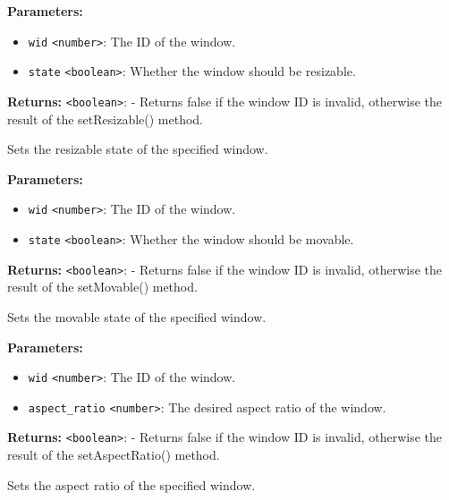 \documentclass[12pt,a4paper]{article}
\begin{document}
\noindent \textbf{Parameters:}
\begin{itemize}
  \item \texttt{wid} \texttt{<number>}: The ID of the window.
  \item \texttt{state} \texttt{<boolean>}: Whether the window should be resizable.
\end{itemize}

\noindent \textbf{Returns:} \texttt{<boolean>}: - Returns false if the window ID is invalid, otherwise the result of the setResizable() method.

\noindent Sets the resizable state of the specified window.

\vspace{5mm}
\noindent {}


\noindent \textbf{Parameters:}
\begin{itemize}
  \item \texttt{wid} \texttt{<number>}: The ID of the window.
  \item \texttt{state} \texttt{<boolean>}: Whether the window should be movable.
\end{itemize}

\noindent \textbf{Returns:} \texttt{<boolean>}: - Returns false if the window ID is invalid, otherwise the result of the setMovable() method.

\noindent Sets the movable state of the specified window.

\vspace{5mm}
\noindent {}


\noindent \textbf{Parameters:}
\begin{itemize}
  \item \texttt{wid} \texttt{<number>}: The ID of the window.
  \item \texttt{aspect\_ratio} \texttt{<number>}: The desired aspect ratio of the window.
\end{itemize}

\noindent \textbf{Returns:} \texttt{<boolean>}: - Returns false if the window ID is invalid, otherwise the result of the setAspectRatio() method.

\noindent Sets the aspect ratio of the specified window.
\end{document}
